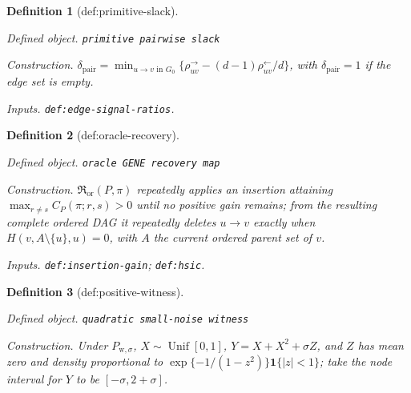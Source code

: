 \documentclass{article}
\newtheorem{definition}{Definition}
\begin{document}
\begin{definition}[def:primitive-slack]\label{def:primitive-slack}
\par\smallskip\noindent\emph{Defined object.} \texttt{primitive pairwise slack}
\par\smallskip\noindent\emph{Construction.} \(\delta_{\mathrm{pair}}=\min_{u\to v\text{ in }G_0}\{\rho^{\to}_{uv}-(d-1)\rho^{\leftarrow}_{uv}/d\}\), with \(\delta_{\mathrm{pair}}=1\) if the edge set is empty.
\par\smallskip\noindent\emph{Inputs.} \texttt{def:\allowbreak{}edge-\allowbreak{}signal-\allowbreak{}ratios}.
\end{definition}

\begin{definition}[def:oracle-recovery]\label{def:oracle-recovery}
\par\smallskip\noindent\emph{Defined object.} \texttt{oracle GENE recovery map}
\par\smallskip\noindent\emph{Construction.} \(\mathfrak R_{\mathrm{or}}(P,\pi)\) repeatedly applies an insertion attaining \(\max_{r\ne s}C_P(\pi;r,s)>0\) until no positive gain remains; from the resulting complete ordered DAG it repeatedly deletes \(u\to v\) exactly when \(H(v,A\setminus\{u\},u)=0\), with \(A\) the current ordered parent set of \(v\).
\par\smallskip\noindent\emph{Inputs.} \texttt{def:\allowbreak{}insertion-\allowbreak{}gain}; \texttt{def:\allowbreak{}hsic}.
\end{definition}

\begin{definition}[def:positive-witness]\label{def:positive-witness}
\par\smallskip\noindent\emph{Defined object.} \texttt{quadratic small-\allowbreak{}noise witness}
\par\smallskip\noindent\emph{Construction.} Under \(P_{\mathrm w,\sigma}\), \(X\sim\operatorname{Unif}[0,1]\), \(Y=X+X^2+\sigma Z\), and \(Z\) has mean zero and density proportional to \(\exp\{-1/(1-z^2)\}\mathbf 1\{|z|<1\}\); take the node interval for \(Y\) to be \([-\sigma,2+\sigma]\).
\end{definition}
\end{document}
